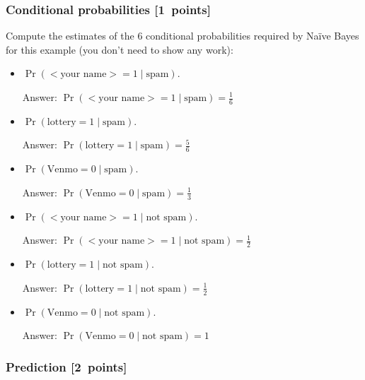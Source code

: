 \documentclass{article}
\newcommand{\blu}[1]{{\textcolor{blu}{#1}}}
\newcommand{\gre}[1]{\textcolor{gre}{#1}}
\newcommand\ans[1]{\par\gre{Answer: #1}}
\let\ask\blu
\newcommand\pts[1]{\textcolor{pointscolour}{[#1~points]}}
\begin{document}
    \subsubsection{Conditional probabilities \pts{1}}

    \ask{Compute the estimates of the 6 conditional probabilities required by Na\"ive Bayes for this example}  (you don't need to show any work):
    \begin{itemize}
        \item $\Pr(\text{$<$your name$>$} = 1  \mid \text{spam})$.
        \ans{$\Pr(\text{$<$your name$>$} = 1  \mid \text{spam}) = \frac{1}{6}$}
        \item $\Pr(\text{lottery} = 1 \mid \text{spam})$.
        \ans{$\Pr(\text{lottery} = 1 \mid \text{spam}) = \frac{5}{6}$}
        \item $\Pr(\text{Venmo} = 0  \mid \text{spam})$.
        \ans{$\Pr(\text{Venmo} = 0  \mid \text{spam}) = \frac{1}{3}$}
        \item $\Pr(\text{$<$your name$>$} = 1  \mid \text{not spam})$.
        \ans{$\Pr(\text{$<$your name$>$} = 1  \mid \text{not spam}) = \frac{1}{2} $}
        \item $\Pr(\text{lottery} = 1  \mid \text{not spam})$.
        \ans{$\Pr(\text{lottery} = 1  \mid \text{not spam}) = \frac{1}{2} $}
        \item $\Pr(\text{Venmo} = 0  \mid \text{not spam})$.
        \ans{$\Pr(\text{Venmo} = 0  \mid \text{not spam}) = 1$}
    \end{itemize}

    \subsubsection{Prediction \pts{2}}
\end{document}
